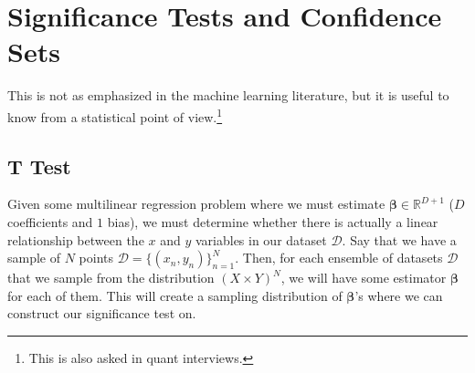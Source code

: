 \section{Significance Tests and Confidence Sets}

  This is not as emphasized in the machine learning literature, but it is useful to know from a statistical point of view.\footnote{This is also asked in quant interviews.}

\subsection{T Test}

  Given some multilinear regression problem where we must estimate $\boldsymbol{\beta} \in \mathbb{R}^{D + 1}$ ($D$ coefficients and $1$ bias), we must determine whether there is actually a linear relationship between the $x$ and $y$ variables in our dataset $\mathcal{D}$. Say that we have a sample of $N$ points $\mathcal{D} = \{(x_n, y_n)\}_{n=1}^N$. Then, for each ensemble of datasets $\mathcal{D}$ that we sample from the distribution $(X \times Y)^N$, we will have some estimator $\boldsymbol{\beta}$ for each of them. This will create a sampling distribution of $\boldsymbol{\beta}$'s where we can construct our significance test on. 


